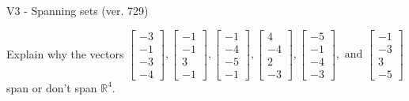 \begin{exercise}
  \begin{exerciseTitle}V3 - Spanning sets (ver. 729)\end{exerciseTitle}
  \begin{exerciseStatement}
    Explain why the vectors \(\left[\begin{array}{r}
-3 \\
-1 \\
-3 \\
-4
\end{array}\right] , \left[\begin{array}{r}
-1 \\
-1 \\
3 \\
-1
\end{array}\right] , \left[\begin{array}{r}
-1 \\
-4 \\
-5 \\
-1
\end{array}\right] , \left[\begin{array}{r}
4 \\
-4 \\
2 \\
-3
\end{array}\right] , \left[\begin{array}{r}
-5 \\
-1 \\
-4 \\
-3
\end{array}\right] , \text{ and } \left[\begin{array}{r}
-1 \\
-3 \\
3 \\
-5
\end{array}\right]\) span or don't span \(\mathbb{R}^4\). 
	



\end{exerciseStatement}
\end{exercise}

